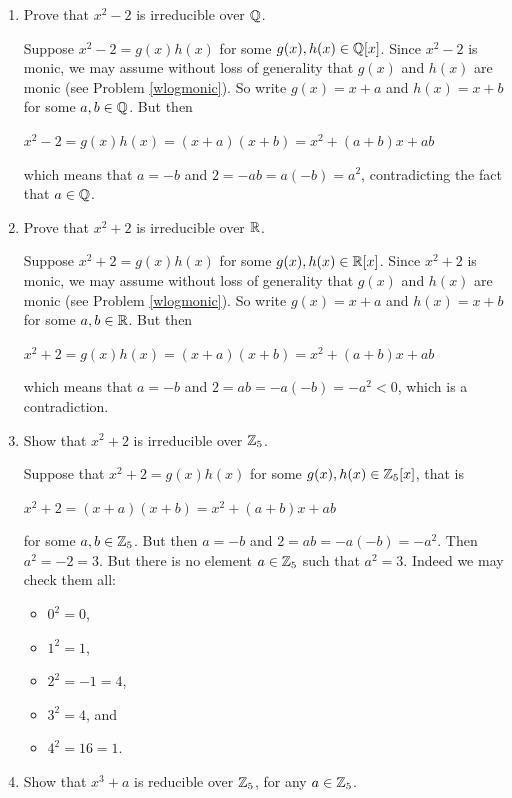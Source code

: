 \documentclass[11pt,fleqn,dvipsnames,usenames]{article}
\begin{document}
\begin{enumerate}
\item Prove that $x^2 - 2$ is irreducible over $\mathbb{Q}$.
\vsmsp

\solution Suppose $x^2 - 2 = g(x)h(x)$ for some $g(x),h(x)\in\mathbb{Q}[x]$.  Since $x^2 - 2$ is monic, we may assume without loss of generality that $g(x)$ and $h(x)$ are monic (see Problem \ref{wlogmonic}).  So write $g(x) = x + a$ and $h(x) = x + b$ for some $a,b\in \mathbb{Q}$.  But then
\begin{center}
$x^2 - 2 = g(x)h(x) = (x + a)(x + b) = x^2 + (a+b)x + ab$
\end{center}
which means that $a = -b$ and $2 = -ab = a(-b) = a^2$, contradicting the fact that $a\in\mathbb{Q}$.

\item Prove that $x^2 + 2$ is irreducible over $\mathbb{R}$.
\vsmsp

\solution Suppose $x^2 + 2 = g(x)h(x)$ for some $g(x),h(x)\in \mathbb{R}[x]$.  Since $x^2 + 2$ is monic, we may assume without loss of generality that $g(x)$ and $h(x)$ are monic (see Problem \ref{wlogmonic}).  So write
$g(x) = x + a$ and $h(x) = x + b$ for some $a,b\in \mathbb{R}$.  But then
\begin{center}
$x^2 + 2 = g(x)h(x) = (x + a)(x + b) = x^2 + (a+b)x + ab$
\end{center}
which means that $a = -b$ and $2 = ab = -a(-b) = -a^2 < 0$, which is a contradiction.

\item Show that $x^2 + 2$ is irreducible over $\mathbb{Z}_5$.
\vsmsp

\solution Suppose that $x^2 + 2 = g(x)h(x)$ for some $g(x),h(x)\in\mathbb{Z}_{5}[x]$, that is 
\begin{center}
$x^2 + 2 = (x + a)(x + b) = x^2 + (a + b)x + ab$
\end{center}
for some $a,b\in\mathbb{Z}_{5}$.  But then $a = -b$ and $2 = ab = -a(-b) = -a^2$.  Then $a^2 = -2 = 3$.
But there is no element $a\in\mathbb{Z}_{5}$ such that $a^2 = 3$.  Indeed we may check them all: 
\begin{itemize}
\item $0^2 = 0$,
\item $1^2 = 1$,
\item $2^2 = -1 = 4$,
\item $3^2 = 4$, and 
\item $4^2 = 16 = 1$.
\end{itemize}

\item Show that $x^3 + a$ is reducible over $\mathbb{Z}_5$, for any $a\in \mathbb{Z}_5$.
\vsmsp


\end{enumerate}
\end{document}

